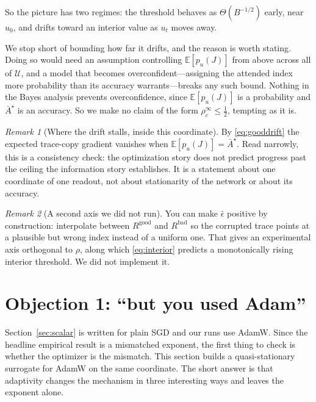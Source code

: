 \documentclass{article}
\theoremstyle{plain}
\theoremstyle{definition}
\theoremstyle{remark}
\newtheorem{remark}{Remark}
\newcommand{\E}{\mathbb{E}}
\newcommand{\1}{\mathbf{1}}
\newcommand{\cU}{\mathcal{U}}
\newcommand{\good}{\mathrm{good}}
\newcommand{\bad}{\mathrm{bad}}
\begin{document}
So the picture has two regimes: the threshold behaves as $\Theta(B^{-1/2})$ early,
near $u_0$, and drifts toward an interior value as $u_t$ moves away.

We stop short of bounding how far it drifts, and the reason is worth stating.
Doing so would need an assumption controlling $\E[p_u(J)]$ from above across all
of $\cU$, and a model that becomes overconfident---assigning the attended index
more probability than its accuracy warrants---breaks any such bound. Nothing in
the Bayes analysis prevents overconfidence, since $\E[p_u(J)]$ is a probability
and $\bar A^\star$ is an accuracy. So we make no claim of the form
$\rho_c^\infty\le\frac12$, tempting as it is.

\begin{remark}[Where the drift stalls, inside this coordinate]
\label{rem:stall}
By \eqref{eq:gooddrift} the expected trace-copy gradient vanishes when
$\E[p_u(J)] = \bar A^\star$. Read narrowly, this is a consistency check: the
optimization story does not predict progress past the ceiling the information
story establishes. It is a statement about one coordinate of one readout, not
about stationarity of the network or about its accuracy.
\end{remark}

\begin{remark}[A second axis we did not run]
\label{rem:adversarial}
You can make $\bar\epsilon$ positive by construction: interpolate between
$R^{\good}$ and $R^{\bad}$ so the corrupted trace points at a plausible but wrong
index instead of a uniform one. That gives an experimental axis orthogonal to
$\rho$, along which \eqref{eq:interior} predicts a monotonically rising interior
threshold. We did not implement it.
\end{remark}

\section{Objection 1: ``but you used Adam''}
\label{sec:adam}

Section~\ref{sec:scalar} is written for plain SGD and our runs use AdamW. Since
the headline empirical result is a mismatched exponent, the first thing to check
is whether the optimizer is the mismatch. This section builds a quasi-stationary
surrogate for AdamW on the same coordinate. The short answer is that adaptivity
changes the mechanism in three interesting ways and leaves the exponent alone.
\end{document}
